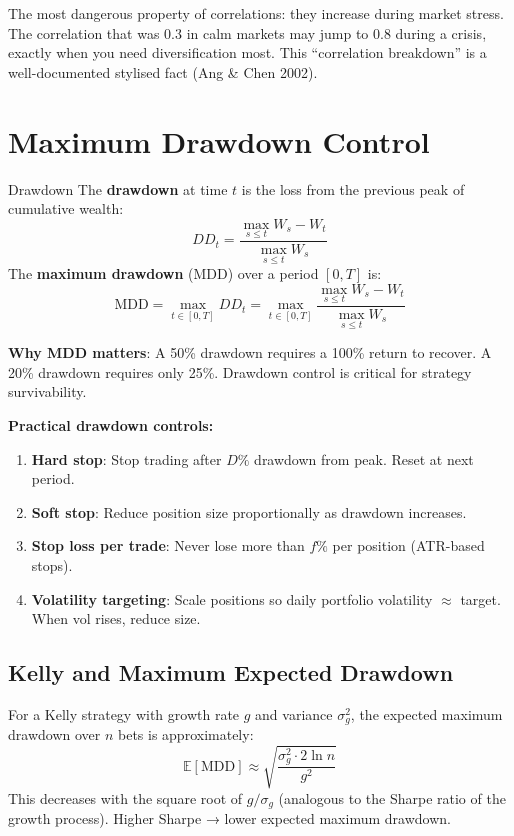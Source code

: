 \documentclass[12pt,a4paper,openany]{report}
\theoremstyle{definition}
\newcommand{\E}{\mathbb{E}}
\begin{document}
The most dangerous property of correlations: they increase during market stress. The correlation that was 0.3 in calm markets may jump to 0.8 during a crisis, exactly when you need diversification most. This ``correlation breakdown'' is a well-documented stylised fact (Ang \& Chen 2002).

\section{Maximum Drawdown Control}

\begin{definitionbox}{Drawdown}
The \textbf{drawdown} at time $t$ is the loss from the previous peak of cumulative wealth:
\[
  DD_t = \frac{\max_{s \leq t} W_s - W_t}{\max_{s \leq t} W_s}
\]
The \textbf{maximum drawdown} (MDD) over a period $[0, T]$ is:
\[
  \text{MDD} = \max_{t \in [0,T]} DD_t = \max_{t \in [0,T]} \frac{\max_{s \leq t}W_s - W_t}{\max_{s \leq t}W_s}
\]
\end{definitionbox}

\textbf{Why MDD matters}: A 50\% drawdown requires a 100\% return to recover. A 20\% drawdown requires only 25\%. Drawdown control is critical for strategy survivability.

\textbf{Practical drawdown controls:}
\begin{enumerate}[label=\arabic*.]
  \item \textbf{Hard stop}: Stop trading after $D\%$ drawdown from peak. Reset at next period.
  \item \textbf{Soft stop}: Reduce position size proportionally as drawdown increases.
  \item \textbf{Stop loss per trade}: Never lose more than $f\%$ per position (ATR-based stops).
  \item \textbf{Volatility targeting}: Scale positions so daily portfolio volatility $\approx$ target. When vol rises, reduce size.
\end{enumerate}

\subsection{Kelly and Maximum Expected Drawdown}

For a Kelly strategy with growth rate $g$ and variance $\sigma_g^2$, the expected maximum drawdown over $n$ bets is approximately:
\begin{equation}
  \E[\text{MDD}] \approx \sqrt{\frac{\sigma_g^2 \cdot 2\ln n}{g^2}}
\end{equation}
This decreases with the square root of $g/\sigma_g$ (analogous to the Sharpe ratio of the growth process). Higher Sharpe → lower expected maximum drawdown.
\end{document}

